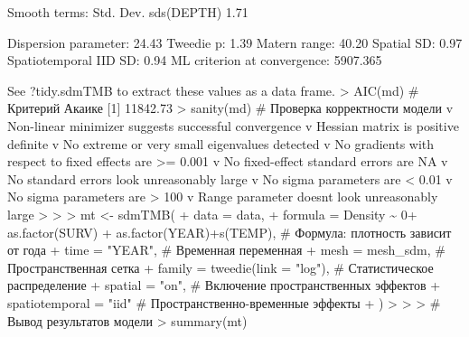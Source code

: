 \documentclass[
  letterpaper,
  DIV=11,
  numbers=noendperiod]{scrreprt}
\newenvironment{Shaded}{\begin{snugshade}}{\end{snugshade}}
\newcommand{\AttributeTok}[1]{\textcolor[rgb]{0.40,0.45,0.13}{#1}}
\newcommand{\CommentTok}[1]{\textcolor[rgb]{0.37,0.37,0.37}{#1}}
\newcommand{\DecValTok}[1]{\textcolor[rgb]{0.68,0.00,0.00}{#1}}
\newcommand{\ErrorTok}[1]{\textcolor[rgb]{0.68,0.00,0.00}{#1}}
\newcommand{\FunctionTok}[1]{\textcolor[rgb]{0.28,0.35,0.67}{#1}}
\newcommand{\NormalTok}[1]{\textcolor[rgb]{0.00,0.23,0.31}{#1}}
\newcommand{\OtherTok}[1]{\textcolor[rgb]{0.00,0.23,0.31}{#1}}
\newcommand{\SpecialCharTok}[1]{\textcolor[rgb]{0.37,0.37,0.37}{#1}}
\newcommand{\StringTok}[1]{\textcolor[rgb]{0.13,0.47,0.30}{#1}}
\begin{document}
\begin{Shaded}
\begin{Highlighting}[]
\StringTok{Smooth terms:}
\StringTok{           Std. Dev.}
\StringTok{sds(DEPTH)      1.71}

\StringTok{Dispersion parameter: 24.43}
\StringTok{Tweedie p: 1.39}
\StringTok{Matern range: 40.20}
\StringTok{Spatial SD: 0.97}
\StringTok{Spatiotemporal IID SD: 0.94}
\StringTok{ML criterion at convergence: 5907.365}

\StringTok{See ?tidy.sdmTMB to extract these values as a data frame.}
\StringTok{\textgreater{} AIC(md)  \# Критерий Акаике}
\StringTok{[1] 11842.73}
\StringTok{\textgreater{} sanity(md)  \# Проверка корректности модели}
\StringTok{v Non{-}linear minimizer suggests successful convergence}
\StringTok{v Hessian matrix is positive definite}
\StringTok{v No extreme or very small eigenvalues detected}
\StringTok{v No gradients with respect to fixed effects are \textgreater{}= 0.001}
\StringTok{v No fixed{-}effect standard errors are NA}
\StringTok{v No standard errors look unreasonably large}
\StringTok{v No sigma parameters are \textless{} 0.01}
\StringTok{v No sigma parameters are \textgreater{} 100}
\StringTok{v Range parameter doesn\textquotesingle{}}\NormalTok{t look unreasonably large}
\SpecialCharTok{\textgreater{}} 
\ErrorTok{\textgreater{}} 
\ErrorTok{\textgreater{}}\NormalTok{ mt }\OtherTok{\textless{}{-}} \FunctionTok{sdmTMB}\NormalTok{(}
\SpecialCharTok{+}   \AttributeTok{data =}\NormalTok{ data, }
\SpecialCharTok{+}   \AttributeTok{formula =}\NormalTok{ Density }\SpecialCharTok{\textasciitilde{}} \DecValTok{0}\SpecialCharTok{+} \FunctionTok{as.factor}\NormalTok{(SURV) }\SpecialCharTok{+} \FunctionTok{as.factor}\NormalTok{(YEAR)}\SpecialCharTok{+}\FunctionTok{s}\NormalTok{(TEMP),  }\CommentTok{\# Формула: плотность зависит от года}
\SpecialCharTok{+}   \AttributeTok{time =} \StringTok{"YEAR"}\NormalTok{,         }\CommentTok{\# Временная переменная}
\SpecialCharTok{+}   \AttributeTok{mesh =}\NormalTok{ mesh\_sdm,       }\CommentTok{\# Пространственная сетка}
\SpecialCharTok{+}   \AttributeTok{family =} \FunctionTok{tweedie}\NormalTok{(}\AttributeTok{link =} \StringTok{"log"}\NormalTok{),  }\CommentTok{\# Статистическое распределение}
\SpecialCharTok{+}   \AttributeTok{spatial =} \StringTok{"on"}\NormalTok{,        }\CommentTok{\# Включение пространственных эффектов}
\SpecialCharTok{+}   \AttributeTok{spatiotemporal =} \StringTok{"iid"} \CommentTok{\# Пространственно{-}временные эффекты}
\SpecialCharTok{+}\NormalTok{ )}
\SpecialCharTok{\textgreater{}} 
\ErrorTok{\textgreater{}} 
\ErrorTok{\textgreater{}} \CommentTok{\# Вывод результатов модели}
\ErrorTok{\textgreater{}} \FunctionTok{summary}\NormalTok{(mt)}

\end{Highlighting}
\end{Shaded}
\end{document}
